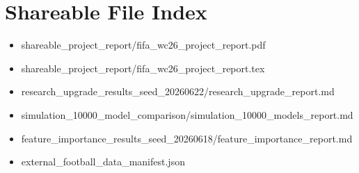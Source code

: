 \documentclass[10pt]{article}
\begin{document}
\section{Shareable File Index}

\begin{itemize}
  \item shareable\_project\_report/fifa\_wc26\_project\_report.pdf
  \item shareable\_project\_report/fifa\_wc26\_project\_report.tex
  \item research\_upgrade\_results\_seed\_20260622/research\_upgrade\_report.md
  \item simulation\_10000\_model\_comparison/simulation\_10000\_models\_report.md
  \item feature\_importance\_results\_seed\_20260618/feature\_importance\_report.md
  \item external\_football\_data\_manifest.json
\end{itemize}
\end{document}

